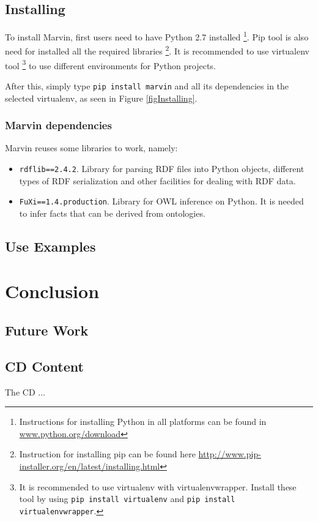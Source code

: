 \documentclass{report}
\begin{document}

\section{Installing}

To install Marvin, first users need to have Python 2.7 installed \footnote{Instructions for installing Python in all platforms can be found in \url{www.python.org/download}}.
Pip tool is also need for installed all the required libraries \footnote{Instruction for installing pip can be found here \url{http://www.pip-installer.org/en/latest/installing.html}}.
It is recommended to use virtualenv tool \footnote{It is recommended to use virtualenv with virtualenvwrapper. Install these tool by using \texttt{pip install virtualenv} and \texttt{pip install virtualenvwrapper}.} to use different environments for Python projects.

After this, simply type \texttt{pip install marvin} and all its dependencies in the selected virtualenv, as seen in Figure \ref{figInstalling}.


\subsection{Marvin dependencies}

Marvin reuses some libraries to work, namely:

\begin{itemize}
    \item \texttt{rdflib==2.4.2}. Library for parsing RDF files into Python objects, different types of RDF serialization and other facilities for dealing with RDF data.
    \item \texttt{FuXi==1.4.production}. Library for OWL inference on Python.
        It is needed to infer facts that can be derived from ontologies.
\end{itemize}
\section{Use Examples}

\chapter{Conclusion}
\label{conclusion}

\section{Future Work}

\begin{appendices}
\chapter{CD Content}

The CD ...

\end{appendices}



\end{document}
